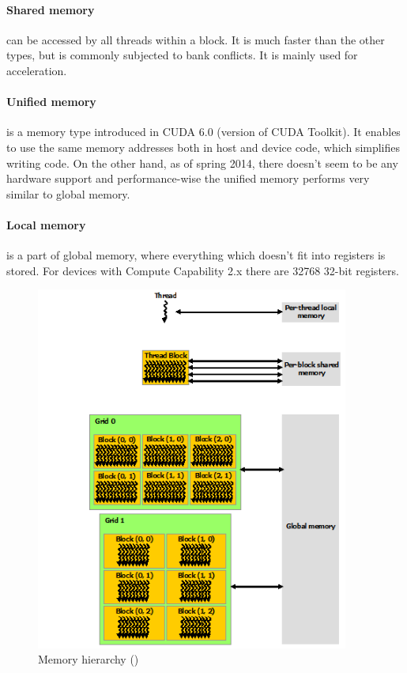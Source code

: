 \paragraph{Shared memory} can be accessed by all threads within a block. It is much faster than the other types, but is commonly subjected to bank conflicts. It is mainly used for acceleration.

\paragraph{Unified memory} is a memory type introduced in CUDA 6.0 (version of CUDA Toolkit). It enables to use the same memory addresses both in host and device code, which simplifies writing code. On the other hand, as of spring 2014, there doesn't seem to be any hardware support and performance-wise the unified memory performs very similar to global memory.

\paragraph{Local memory} is a part of global memory, where everything which doesn't fit into registers is stored. For devices with Compute Capability 2.x there are 32768 32-bit registers.

\begin{center}
\begin{figure}[h]
	\centering\includegraphics[height=12cm]{fig/memory-hierarchy.png}
	\caption{Memory hierarchy (\cite{cuda-toolkit-docs})}
\end{figure}
\end{center}

